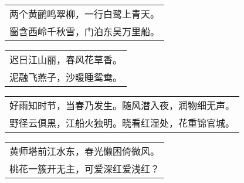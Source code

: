 \nopagebreak%
\nopagebreak%
\noindent\begin{minipage}{\linewidth}
  \vskip-3pt\begin{table}[H]
    \centering
    \begin{tabular}{@{}l@{}}
两个黄鹂鸣翠柳，一行白鹭上青天。\\
窗含西岭千秋雪，门泊东吴万里船。
    \end{tabular}
  \end{table}
\end{minipage}
\vspace{1cm}


\nopagebreak%
\nopagebreak%
\noindent\begin{minipage}{\linewidth}
  \vskip-3pt\begin{table}[H]
    \centering
    \begin{tabular}{@{}l@{}}
迟日江山丽，春风花草香。\\
泥融飞燕子，沙暖睡鸳鸯。
    \end{tabular}
  \end{table}
\end{minipage}
\vspace{1cm}


\nopagebreak%
\nopagebreak%
\noindent\begin{minipage}{\linewidth}
  \vskip-3pt\begin{table}[H]
    \centering
    \begin{tabular}{@{}l@{}}
好雨知时节，当春乃发生。随风潜入夜，润物细无声。\\
野径云俱黑，江船火独明。晓看红湿处，花重锦官城。
    \end{tabular}
  \end{table}
\end{minipage}
\vspace{1cm}


\nopagebreak%
\nopagebreak%
\noindent\begin{minipage}{\linewidth}
  \vskip-3pt\begin{table}[H]
    \centering
    \begin{tabular}{@{}l@{}}
黄师塔前江水东，春光懒困倚微风。\\
桃花一簇开无主，可爱深红爱浅红？
    \end{tabular}
  \end{table}
\end{minipage}
\vspace{1cm}


